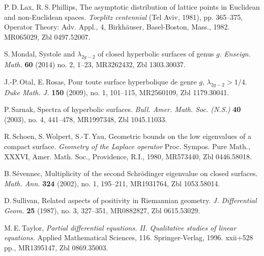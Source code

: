 \begin{thebibliography}{99}
P.\,D.\,Lax, R.\,S.\,Phillips,
The asymptotic distribution of lattice points in Euclidean and non-Euclidean spaces.
\emph{Toeplitz centennial} (Tel Aviv, 1981), pp. 365--375,
Operator Theory: Adv. Appl., 4, Birkh\"auser, Basel-Boston, Mass., 1982.
MR065029, Zbl 0497.52007.

S.\,Mondal,
Systole and $\lambda_{2g-2}$ of closed hyperbolic surfaces of genus $g$.
\emph{Enseign. Math.} {\bf 60} (2014) no. 2, 1--23,
MR3262432, Zbl 1303.30037.  

J.-P.\,Otal, E.\,Rosas,
Pour toute surface hyperbolique de genre $g$, $\lambda_{2g-2}>1/4$.
\emph{Duke Math. J.} {\bf 150} (2009), no. 1, 101--115,
MR2560109, Zbl 1179.30041.

P.\,Sarnak,
Spectra of hyperbolic surfaces.
\emph{Bull. Amer. Math. Soc. (N.S.)} {\bf 40} (2003), no. 4, 441--478,
MR1997348, Zbl 1045.11033.
 
R.\,Schoen,  S.\,Wolpert, S.-T.\,Yau,
Geometric bounds on the low eigenvalues of a compact surface.
\emph{Geometry of the Laplace operator}
Proc. Sympos. Pure Math., XXXVI, Amer. Math. Soc., Providence, R.I., 1980,
MR573440, Zbl 0446.58018. 

B.\,S\'evennec,
Multiplicity of the second Schr\"odinger eigenvalue on closed surfaces.
\emph{Math. Ann.} {\bf 324} (2002), no. 1, 195--211,
MR1931764, Zbl 1053.58014.

D.\,Sullivan,
Related aspects of positivity in Riemannian geometry.
\emph{J. Differential Geom.} {\bf 25} (1987), no. 3, 327--351,
MR0882827, Zbl 0615.53029. 

M.\,E.\,Taylor,
\emph{Partial differential equations. II. Qualitative studies of linear equations.}
Applied Mathematical Sciences, 116. Springer-Verlag, 1996. xxii+528 pp.,
MR1395147, Zbl 0869.35003.

\end{thebibliography}

  
